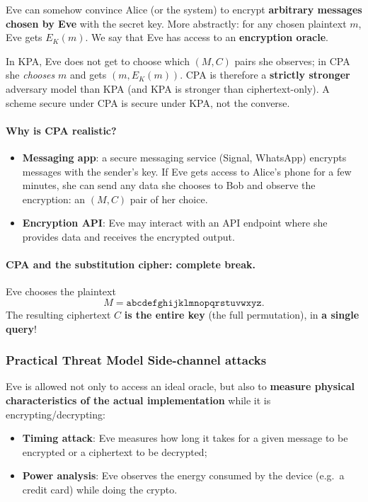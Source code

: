 \begin{definition}
Eve can somehow convince Alice (or the system) to encrypt \textbf{arbitrary messages chosen by Eve} with the secret key. More abstractly: for any chosen plaintext $m$, Eve gets $E_K(m)$. We say that Eve has access to an \textbf{encryption oracle}.
\end{definition}

\begin{remark}
In KPA, Eve does not get to choose which $(M, C)$ pairs she observes; in CPA she \emph{chooses} $m$ and gets $(m, E_K(m))$. CPA is therefore a \textbf{strictly stronger} adversary model than KPA (and KPA is stronger than ciphertext-only). A scheme secure under CPA is secure under KPA, not the converse.
\end{remark}

\paragraph{Why is CPA realistic?}
\begin{itemize}
    \item \textbf{Messaging app}: a secure messaging service (Signal, WhatsApp) encrypts messages with the sender's key. If Eve gets access to Alice's phone for a few minutes, she can send any data she chooses to Bob and observe the encryption: an $(M, C)$ pair of her choice.
    \item \textbf{Encryption API}: Eve may interact with an API endpoint where she provides data and receives the encrypted output.
\end{itemize}

\paragraph{CPA and the substitution cipher: complete break.} Eve chooses the plaintext
\[
M = \texttt{abcdefghijklmnopqrstuvwxyz}.
\]
The resulting ciphertext $C$ \textbf{is the entire key} (the full permutation), in \textbf{a single query}!

\subsubsection{Practical Threat Model Side-channel attacks}

\begin{definition}
Eve is allowed not only to access an ideal oracle, but also to \textbf{measure physical characteristics of the actual implementation} while it is encrypting/decrypting:
\begin{itemize}
    \item \textbf{Timing attack}: Eve measures how long it takes for a given message to be encrypted or a ciphertext to be decrypted;
    \item \textbf{Power analysis}: Eve observes the energy consumed by the device (e.g.\ a credit card) while doing the crypto.
\end{itemize}
\end{definition}

